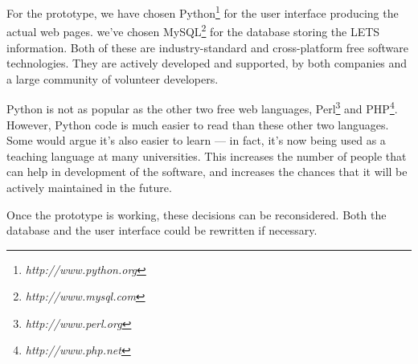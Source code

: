 \documentclass[a4paper,11pt]{article}
\begin{document}
For the prototype, we have chosen Python\footnote{ \textit{http://www.python.org} } for the user interface producing the actual web pages. we've chosen MySQL\footnote{ \textit{http://www.mysql.com} } for the database storing the LETS information. Both of these are industry-standard and cross-platform free software technologies. They are actively developed and supported, by both companies and a large community of volunteer developers.

Python is not as popular as the other two free web languages, Perl\footnote{ \textit{http://www.perl.org} } and PHP\footnote{ \textit{http://www.php.net} }. However, Python code is much easier to read than these other two languages. Some would argue it's also easier to learn --- in fact, it's now being used as a teaching language at many universities. This increases the number of people that can help in development of the software, and increases the chances that it will be actively maintained in the future.

Once the prototype is working, these decisions can be reconsidered. Both the database and the user interface could be rewritten if necessary.











\end{document}

